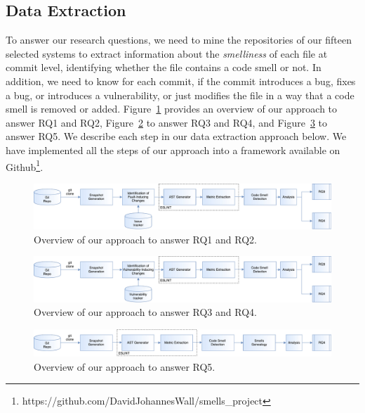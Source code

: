 \subsection{Data Extraction}\label{extraction}
To answer our research questions, we need to mine the repositories of our {\color{blue}fifteen} selected systems to extract information about the \emph{smelliness} of each file at commit level, identifying whether the file contains a code smell or not. In addition, we need to know for each commit, if the commit introduces a bug, fixes a bug{\color{blue}, or introduces a vulnerability,} or just modifies the file in a way that a code smell is removed or added. Figure~\ref{process} provides an overview of our approach {\color{blue}to answer RQ1 and RQ2, Figure~\ref{process2} to answer RQ3 and RQ4, and Figure~\ref{process3} to answer RQ5}. We describe each step in our data extraction approach below. We have implemented all the steps of our approach into a framework available on Github\footnote{https://github.com/DavidJohannesWall/smells\_project}.

\begin{figure}[t]
\captionsetup{font=small}
\centering%
	\includegraphics[scale=0.3]{pdfs/total.pdf}
	\caption{Overview of our approach to answer RQ1 and RQ2.}
\label{process}
\end{figure}

\begin{figure}[t]
	\captionsetup{font=small}
	\centering%
	\includegraphics[scale=0.3]{pdfs/total2.pdf}
	\caption{Overview of our approach to answer RQ3 and RQ4.}
	\label{process2}
\end{figure}

\begin{figure}[t]
	\captionsetup{font=small}
	\centering%
	\includegraphics[scale=0.3]{pdfs/total3.pdf}
	\caption{Overview of our approach to answer RQ5.}
	\label{process3}
\end{figure}

